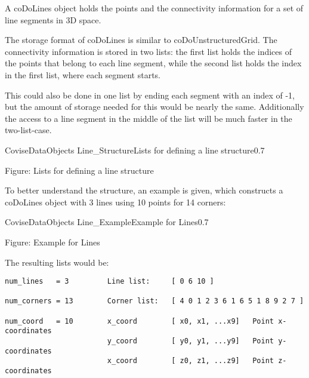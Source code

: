 A coDoLines object holds the points and the connectivity information for a set 
of  line segments in 3D space.

The storage format of coDoLines is similar to coDoUnstructuredGrid. The connectivity 
information is stored in two lists: the first list holds the indices of the points 
that belong to each line segment, while the second list holds the index in 
the first list, where each segment starts. 

This could also be done in one list by ending each segment with an index of -1, 
but the amount of storage needed for this would be nearly the same.
Additionally the access to a line segment in the middle of the list will be much 
faster in the two-list-case.


\begin{covimg}{CoviseDataObjects}
	  {Line_Structure}{Lists for defining a line structure}{0.7}\end{covimg}
\begin{htmlonly}
Figure: Lists for defining a line structure
\end{htmlonly}
\vspace*{1cm}

To better understand the structure, an example is given, which constructs 
a coDoLines object with 3 lines using 10 points for 14 corners:

\begin{covimg}{CoviseDataObjects}
		    {Line_Example}{Example for Lines}{0.7}\end{covimg}
\begin{htmlonly}
Figure: Example for Lines
\end{htmlonly}
\vspace*{1cm}

The resulting lists would be:

\begin{htmlonly}
\begin{verbatim}
num_lines   = 3         Line list:     [ 0 6 10 ]

num_corners = 13        Corner list:   [ 4 0 1 2 3 6 1 6 5 1 8 9 2 7 ]

num_coord   = 10        x_coord        [ x0, x1, ...x9]   Point x-coordinates
                        y_coord        [ y0, y1, ...y9]   Point y-coordinates
                        x_coord        [ z0, z1, ...z9]   Point z-coordinates
\end{verbatim}
\end{htmlonly}

